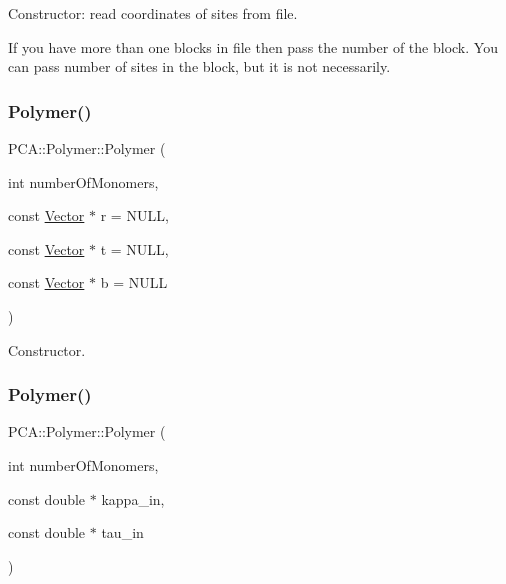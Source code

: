 Constructor\+: read coordinates of sites from file. 

If you have more than one blocks in file then pass the number of the block. You can pass number of sites in the block, but it is not necessarily. \hypertarget{class_p_c_a_1_1_polymer_ac2645c33eba98a8ec1670d69b92060c8}{}\label{class_p_c_a_1_1_polymer_ac2645c33eba98a8ec1670d69b92060c8} 
\subsubsection{\texorpdfstring{Polymer()}{Polymer()}\hspace{0.1cm}{\footnotesize\ttfamily [2/4]}}
{\footnotesize\ttfamily P\+C\+A\+::\+Polymer\+::\+Polymer (\begin{DoxyParamCaption}\item[{int}]{number\+Of\+Monomers,  }\item[{const \hyperlink{class_p_c_a_1_1_vector}{Vector} $\ast$}]{r = {\ttfamily NULL},  }\item[{const \hyperlink{class_p_c_a_1_1_vector}{Vector} $\ast$}]{t = {\ttfamily NULL},  }\item[{const \hyperlink{class_p_c_a_1_1_vector}{Vector} $\ast$}]{b = {\ttfamily NULL} }\end{DoxyParamCaption})}



Constructor. 

\hypertarget{class_p_c_a_1_1_polymer_a7d08722028cd9bf11b042a1b3b0e1d37}{}\label{class_p_c_a_1_1_polymer_a7d08722028cd9bf11b042a1b3b0e1d37} 
\subsubsection{\texorpdfstring{Polymer()}{Polymer()}\hspace{0.1cm}{\footnotesize\ttfamily [3/4]}}
{\footnotesize\ttfamily P\+C\+A\+::\+Polymer\+::\+Polymer (\begin{DoxyParamCaption}\item[{int}]{number\+Of\+Monomers,  }\item[{const double $\ast$}]{kappa\+\_\+in,  }\item[{const double $\ast$}]{tau\+\_\+in }\end{DoxyParamCaption})}



